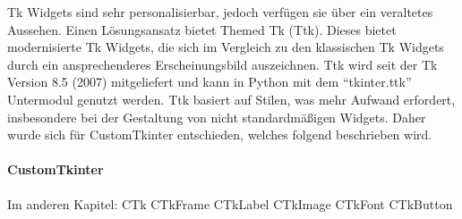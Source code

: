 Tk Widgets sind sehr personalisierbar, jedoch verfügen sie über ein veraltetes Aussehen. Einen Lösungsansatz bietet Themed Tk (Ttk). Dieses bietet modernisierte Tk Widgets, die sich im Vergleich zu den klassischen Tk Widgets durch ein ansprechenderes Erscheinungsbild auszeichnen. Ttk wird seit der Tk Version 8.5 (2007) mitgeliefert und kann in Python mit dem \enquote{tkinter.ttk} Untermodul genutzt werden. Ttk basiert auf Stilen, was mehr Aufwand erfordert, insbesondere bei der Gestaltung von nicht standardmäßigen Widgets. Daher wurde sich für CustomTkinter entschieden, welches folgend beschrieben wird. \cite[vgl.][]{Python_Software_Foundation_Tk:o.J.}


\paragraph{CustomTkinter}

Im anderen Kapitel:
CTk
CTkFrame
CTkLabel
CTkImage
CTkFont
CTkButton
\cite[vgl.][]{Schimansky_Git:o.J.}

